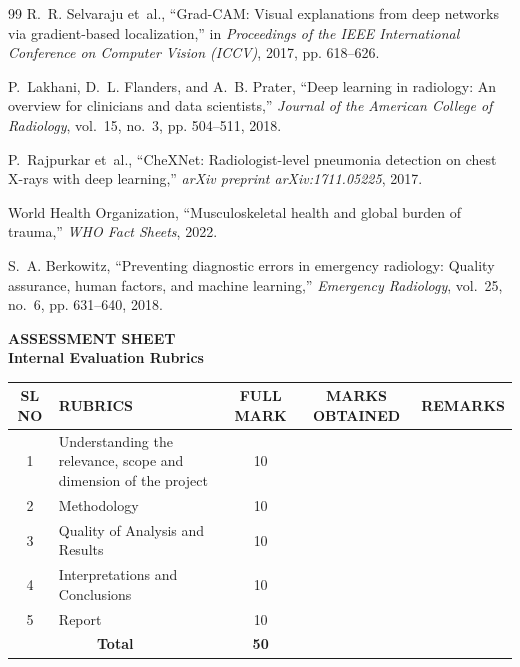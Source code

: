 \documentclass[12pt, a4paper]{report}
\begin{document}
\begin{thebibliography}{99}
R.~R. Selvaraju et~al., ``Grad-CAM: Visual explanations from deep networks via gradient-based localization,'' in \emph{Proceedings of the IEEE International Conference on Computer Vision (ICCV)}, 2017, pp. 618--626.

P.~Lakhani, D.~L. Flanders, and A.~B. Prater, ``Deep learning in radiology: An overview for clinicians and data scientists,'' \emph{Journal of the American College of Radiology}, vol.~15, no.~3, pp. 504--511, 2018.

P.~Rajpurkar et~al., ``CheXNet: Radiologist-level pneumonia detection on chest X-rays with deep learning,'' \emph{arXiv preprint arXiv:1711.05225}, 2017.

World Health Organization, ``Musculoskeletal health and global burden of trauma,'' \emph{WHO Fact Sheets}, 2022.

S.~A. Berkowitz, ``Preventing diagnostic errors in emergency radiology: Quality assurance, human factors, and machine learning,'' \emph{Emergency Radiology}, vol.~25, no.~6, pp. 631--640, 2018.
\end{thebibliography}

\newpage
\thispagestyle{plain}
\begin{center}
    {\Large \textbf{ASSESSMENT SHEET}}\\[0.8cm]
    {\normalsize \textbf{Internal Evaluation Rubrics}}\\[0.6cm]
\end{center}

\begin{table}[H]
\centering
\begin{tabular}{|c|p{8.0cm}|c|c|p{2.5cm}|}
\hline
\textbf{SL NO} & \textbf{RUBRICS} & \textbf{FULL MARK} & \textbf{MARKS OBTAINED} & \textbf{REMARKS} \\
\hline
1 & Understanding the relevance, scope and dimension of the project & 10 & & \\
\hline
2 & Methodology & 10 & & \\
\hline
3 & Quality of Analysis and Results & 10 & & \\
\hline
4 & Interpretations and Conclusions & 10 & & \\
\hline
5 & Report & 10 & & \\
\hline
\multicolumn{2}{|c|}{\textbf{Total}} & \textbf{50} & & \\
\hline
\end{tabular}
\end{table}
\end{document}
